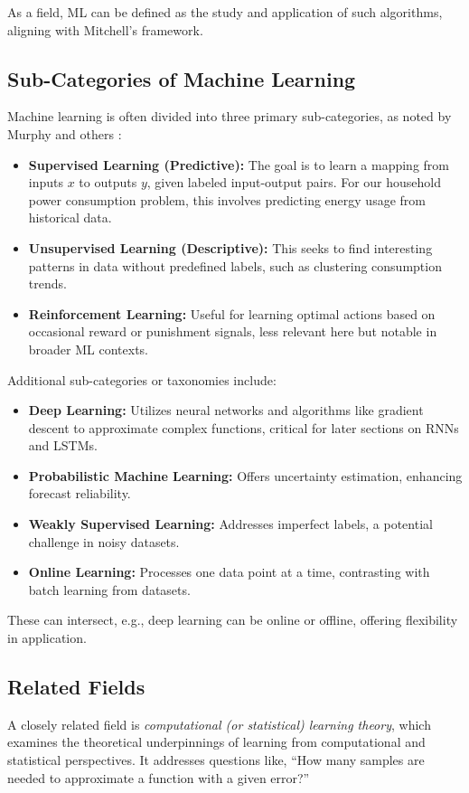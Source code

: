 	As a field, ML can be defined as the study and application of such algorithms, aligning with Mitchell's framework.
	
	\subsection{Sub-Categories of Machine Learning}
	Machine learning is often divided into three primary sub-categories, as noted by Murphy and others \cite{murphy2012machine}:
	\begin{itemize}
		\item \textbf{Supervised Learning (Predictive):} The goal is to learn a mapping from inputs $x$ to outputs $y$, given labeled input-output pairs. For our household power consumption problem, this involves predicting energy usage from historical data.
		\item \textbf{Unsupervised Learning (Descriptive):} This seeks to find interesting patterns in data without predefined labels, such as clustering consumption trends.
		\item \textbf{Reinforcement Learning:} Useful for learning optimal actions based on occasional reward or punishment signals, less relevant here but notable in broader ML contexts.
	\end{itemize}
	
	Additional sub-categories or taxonomies include:
	\begin{itemize}
		\item \textbf{Deep Learning:} Utilizes neural networks and algorithms like gradient descent to approximate complex functions, critical for later sections on RNNs and LSTMs.
		\item \textbf{Probabilistic Machine Learning:} Offers uncertainty estimation, enhancing forecast reliability.
		\item \textbf{Weakly Supervised Learning:} Addresses imperfect labels, a potential challenge in noisy datasets.
		\item \textbf{Online Learning:} Processes one data point at a time, contrasting with batch learning from datasets.
	\end{itemize}
	These can intersect, e.g., deep learning can be online or offline, offering flexibility in application.
	
	\subsection{Related Fields}
	A closely related field is \textit{computational (or statistical) learning theory}, which examines the theoretical underpinnings of learning from computational and statistical perspectives. It addresses questions like, ``How many samples are needed to approximate a function with a given error?''
	
